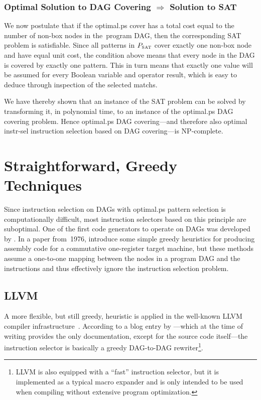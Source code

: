 \subsubsection{Optimal Solution to DAG Covering $\Rightarrow$ Solution to SAT}

We now postulate that if the \gls{optimal.ps} cover has a total cost equal
to the number of non-\glspl{box node} in the~\gls{program DAG}, then the
corresponding \gls{SAT problem} is satisfiable.
%
Since all \glspl{pattern} in
$\mPSat$ cover exactly one non-\gls{box node} and have equal unit cost, the
condition above means that every \gls{node} in the \gls{DAG} is covered by
exactly one \gls{pattern}.
%
This in turn means that exactly one value will be
assumed for every Boolean variable and operator result, which is easy to deduce
through inspection of the selected \glspl{match}.

We have thereby shown that an instance of the \gls{SAT problem} can be solved by
transforming it, in polynomial time, to an instance of the \gls{optimal.ps}
\gls{DAG covering} problem.
%
Hence \gls{optimal.ps} \gls{DAG covering}---and
therefore also \gls{optimal instr-sel} \gls{instruction selection} based on
\gls{DAG covering}---is NP-complete.
%
\hfill\qedsymbol


\section{Straightforward, Greedy Techniques}

Since \gls{instruction selection} on \glspl{DAG} with \gls{optimal.ps}
\gls{pattern selection} is computationally difficult, most \glspl{instruction
  selector} based on this \gls{principle} are suboptimal.
%
One of the first
\glspl{code generator} to operate on \glspl{DAG} was developed by
\textcite{Aho1976b}.
%
In a paper from~1976, \citeauthor{Aho1976b} introduce some
simple greedy heuristics for producing \gls{assembly code} for a commutative
one-\gls{register} \gls{target machine}, but these methods assume a one-to-one
mapping between the \glspl{node} in a \gls{program DAG} and the
\glspl{instruction} and thus effectively ignore the \gls{instruction selection}
problem.


\subsection{LLVM}

A more flexible, but still greedy, heuristic is applied in the well-known
\gls{LLVM} \gls{compiler} infrastructure~\cite{Lattner2004}.
%
According to a blog
entry by \textcite{Bendersky2013}\unskip%
%
---which at the time of writing provides the only documentation, except for
the source code itself---the \gls{instruction selector} is basically a greedy
\mbox{\gls{DAG}-to-\gls{DAG}} rewriter\footnote{\gls{LLVM} is also equipped with
  a ``fast'' \gls{instruction selector}, but it is implemented as a typical
  \gls{macro expander} and is only intended to be used when compiling without
  extensive \gls{program} optimization.}.

